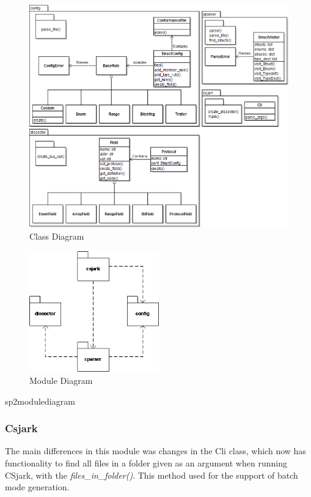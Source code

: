 \begin{figure}[!htb]
	\center
	\includegraphics[width=\textwidth]{./sprints/img/ClassDiagramSprint2v2}
	\caption{Class Diagram\label{fig:sp2:class}}
\end{figure}

\begin{figure}[!htb]
	\center
	\includegraphics[width=0.5\textwidth]{./sprints/img/sp2modulediagram}
	\caption{Module Diagram\label{fig:sp2:module}}
\end{figure}
sp2modulediagram

\subsubsection{Csjark}
The main differences in this module was changes in the Cli class, which now 
has functionality to find all files in a folder given as an argument when 
running CSjark, with the \emph{files\_in\_folder()}. This method used for the 
support of batch mode generation.


